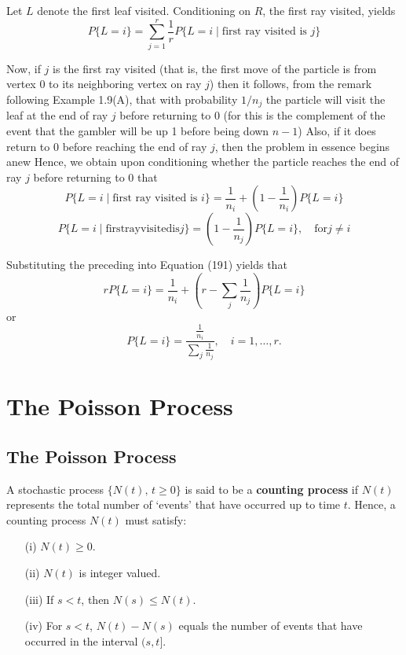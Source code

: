 \documentclass[lang=cn,10pt,thmcnt=section]{elegantbook}
\begin{document}
\begin{solution}
	Let $L$ denote the first leaf visited. Conditioning on $R$, the first ray visited, yields
\begin{equation}
P\{L = i\} = \sum_{j=1}^{r} \frac{1}{r} P\{L = i \mid \text{first ray visited is } j\}
\end{equation}

Now, if $j$ is the first ray visited (that is, the first move of the particle is from vertex 0 to its neighboring vertex on ray $j$) then it follows, from the remark following Example 1.9(A), that with probability $1/n_j$ the particle will visit the leaf at the end of ray $j$ before returning to 0 (for this is the complement of the event that the gambler will be up 1 before being down $n - 1$) Also, if it does return to 0 before reaching the end of ray $j$, then the problem in essence begins anew Hence, we obtain upon conditioning whether the particle reaches the end of ray $j$ before returning to 0 that
\[
P\{L = i \mid \text{first ray visited is } i\} = \frac{1}{n_i} + (1 - \frac{1}{n_i}) P\{L = i\}
\]
\[
	P\{L=i\mid \mathrm{first} \mathrm{ray} \mathrm{visited} \mathrm{is} j\}=(1-\frac{1}{n_j})P\{L=i\},\quad \mathrm{for} j\ne i
\]

Substituting the preceding into Equation (191) yields that
\[
r P\{L = i\} = \frac{1}{n_i} + \left(r - \sum_j \frac{1}{n_j}\right) P\{L = i\}
\]
or
\[
P\{L = i\} = \frac{\frac{1}{n_i}}{\sum_j \frac{1}{n_j}}, \quad i = 1, \ldots, r.
\]
\end{solution}
\chapter{The Poisson Process}
\section{The Poisson Process}
A stochastic process \(\{N(t), \, t \geq 0\}\) is said to be a \textbf{counting process} if \(N(t)\) represents the total number of `events' that have occurred up to time \(t\). Hence, a counting process \(N(t)\) must satisfy:

\begin{enumerate}
    \item[(i)] \(N(t) \geq 0\).
    \item[(ii)] \(N(t)\) is integer valued.
    \item[(iii)] If \(s < t\), then \(N(s) \leq N(t)\).
    \item[(iv)] For \(s < t\), \(N(t) - N(s)\) equals the number of events that have occurred in the interval \((s, t]\).
\end{enumerate}
\end{document}
